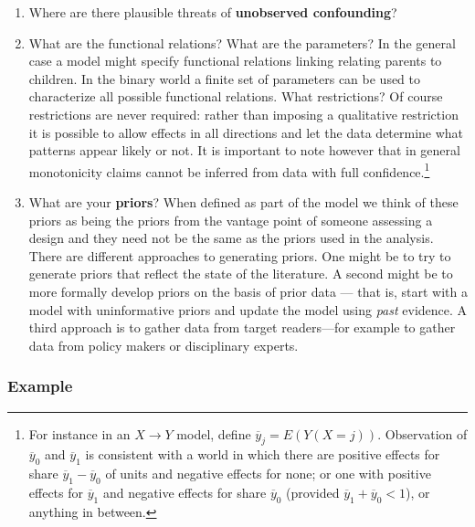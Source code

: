 \documentclass[12pt,]{book}
\let\rmarkdownfootnote\footnote%
\def\footnote{\protect\rmarkdownfootnote}
\begin{document}
\begin{enumerate}
\def\labelenumi{\arabic{enumi}.}
\setcounter{enumi}{2}
\item
  Where are there plausible threats of \textbf{unobserved confounding}?
\item
  What are the functional relations? What are the parameters? In the general case a model might specify functional relations linking relating parents to children. In the binary world a finite set of parameters can be used to characterize all possible functional relations. What restrictions? Of course restrictions are never required: rather than imposing a qualitative restriction it is possible to allow effects in all directions and let the data determine what patterns appear likely or not. It is important to note however that in general monotonicity claims cannot be inferred from data with full confidence.\footnote{For instance in an \(X \rightarrow Y\) model, define \(\overline{y}_j = E(Y(X=j))\). Observation of \(\overline{y}_0\) and \(\overline{y}_1\) is consistent with a world in which there are positive effects for share \(\overline{y}_1 - \overline{y}_0\) of units and negative effects for none; or one with positive effects for \(\overline{y}_1\) and negative effects for share \(\overline{y}_0\) (provided \(\overline{y}_1 + \overline{y}_0 <1\)), or anything in between.}
\item
  What are your \textbf{priors}? When defined as part of the model we think of these priors as being the priors from the vantage point of someone assessing a design and they need not be the same as the priors used in the analysis. There are different approaches to generating priors. One might be to try to generate priors that reflect the state of the literature. A second might be to more formally develop priors on the basis of prior data --- that is, start with a model with uninformative priors and update the model using \emph{past} evidence. A third approach is to gather data from target readers---for example to gather data from policy makers or disciplinary experts.
\end{enumerate}

\hypertarget{example}{%
\subsubsection{Example}\label{example}}
\end{document}
